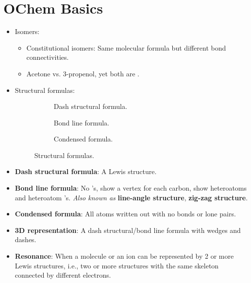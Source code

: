 \documentclass[../notes.tex]{subfiles}
\begin{document}
\section{OChem Basics}
\begin{itemize}
    \item Isomers:
    \begin{itemize}
        \item Constitutional isomers: Same molecular formula but different bond connectivities.
        \item Acetone vs. 3-propenol, yet both are .
    \end{itemize}
    \item Structural formulas:
    \begin{figure}[h!]
        \centering
        \footnotesize
        \begin{subfigure}[b]{0.3\linewidth}
            \centering
            \caption{Dash structural formula.}
            \label{fig:structuralFormulasa}
        \end{subfigure}
        \begin{subfigure}[b]{0.3\linewidth}
            \centering
            \caption{Bond line formula.}
            \label{fig:structuralFormulasb}
        \end{subfigure}
        \begin{subfigure}[b]{0.3\linewidth}
            \centering
            \caption{Condensed formula.}
            \label{fig:structuralFormulasc}
        \end{subfigure}
        \caption{Structural formulas.}
        \label{fig:structuralFormulas}
    \end{figure}
    \item \textbf{Dash structural formula}: A Lewis structure.
    \item \textbf{Bond line formula}: No 's, show a vertex for each carbon, show heteroatoms and heteroatom 's. \emph{Also known as} \textbf{line-angle structure}, \textbf{zig-zag structure}.
    \item \textbf{Condensed formula}: All atoms written out with no bonds or lone pairs.
    \item \textbf{3D representation}: A dash structural/bond line formula with wedges and dashes.
    \item \textbf{Resonance}: When a molecule or an ion can be represented by 2 or more Lewis structures, i.e., two or more structures with the same skeleton connected by different electrons.

\end{itemize}
\end{document}
